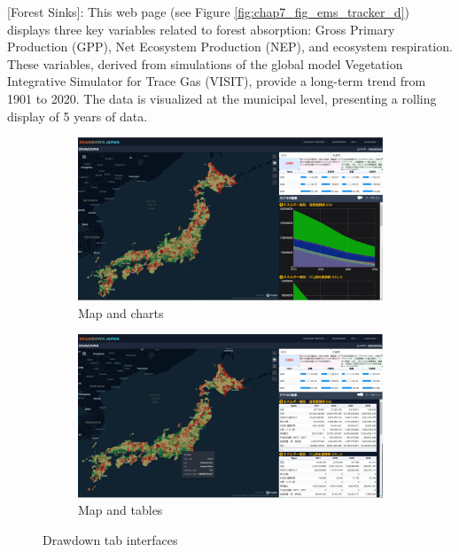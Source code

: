 [Forest Sinks]: This web page (see Figure \ref{fig:chap7_fig_ems_tracker_d}) displays three key variables related to forest absorption: Gross Primary Production (GPP), Net Ecosystem Production (NEP), and ecosystem respiration. These variables, derived from simulations of the global model Vegetation Integrative Simulator for Trace Gas (VISIT), provide a long-term trend from 1901 to 2020. The data is visualized at the municipal level, presenting a rolling display of 5 years of data.\par
\begin{figure}[tbh!]
  \centering
  \begin{subfigure}{.5\textwidth}
      \centering
      \includegraphics[width=.9\textwidth]{figs/chap7/drawdown1.png}
      \caption{Map and charts}
  \end{subfigure}%
  \begin{subfigure}{.5\textwidth}
      \centering
      \includegraphics[width=.9\textwidth]{figs/chap7/drawdown2.png}
      \caption{Map and tables}
  \end{subfigure}
  \caption{Drawdown tab interfaces}
  \label{fig:chap7_fig_drawdown}
\end{figure}


